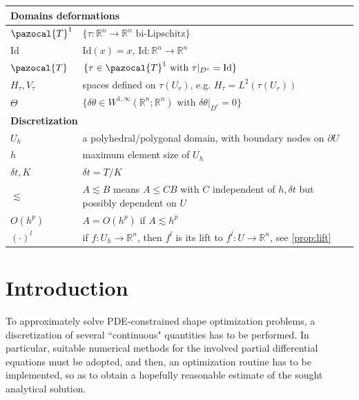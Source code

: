 \documentclass[english,a4paper,9pt,oneside]{scrbook}	%
\theoremstyle{break}
\theoremstyle{remark}
\newcommand{\mR}{\mathbb{R}}
\newcommand{\cT}{\pazocal{T}}
\newcommand{\id}{\text{Id}}
\newcommand{\te}{\theta}
\newcommand{\Te}{\Theta}
\begin{document}
\begin{longtable}{ll}
\multicolumn{2}{l}{\textbf{Domains deformations}}    \\ 
\hline
$\cT^1$ & $\{\tau: \mR^n\rightarrow\mR^n \text{ bi-Lipschitz}\}$                  \\ 
\hline
$\id$ & $\id(x)=x$, $\id:\mR^n\rightarrow\mR^n$                  \\ 
\hline
$\cT$ & $\{\tau \in \cT^1 \text{ with } \tau|_{D^c}=\id\}$                  \\ 
\hline
$H_\tau, V_\tau$ & spaces defined on $\tau(U_r)$, e.g. $H_\tau = L^2(\tau(U_r))$                       \\ 
\hline
$\Te$ & $\{\delta \te \in W^{1,\infty}(\mR^n;\mR^n) \text{ with } \delta \te|_{D^c}=0\}$                       \\ 
\hline

\multicolumn{2}{l}{\textbf{Discretization}}    \\ 
\hline
$U_h$ & a polyhedral/polygonal domain, with boundary nodes on $\partial U$                  \\ 
\hline
$h$ & maximum element size of $U_h$                  \\ 
\hline
$\delta t, K$      & $\delta t = T/K$            \\ 
\hline
$\lesssim$ & $A\lesssim B$ means $A\leq CB$ with $C$ independent of $h, \delta t$ but possibly dependent on $U$                       \\ 
\hline
$O(h^p)$ & $A=O(h^p)$ if $A\lesssim h^p$ \\ 
\hline
$(\cdot)^l$ & if $f:U_h\rightarrow\mR^n$, then $f^l$ is its lift to $f^l: U \rightarrow \mR^n$, see \cref{prop:lift} \\ 
\hline

\end{longtable}

\chapter{Introduction}  \setcounter{page}{1}   %

To approximately solve PDE-constrained shape optimization problems, a discretization of several ``continuous" quantities has to be performed. In particular, suitable numerical methods for the involved partial differential equations must be adopted, and then, an optimization routine has to be implemented, so as to obtain a hopefully reasonable estimate of the sought analytical solution.
\end{document}
